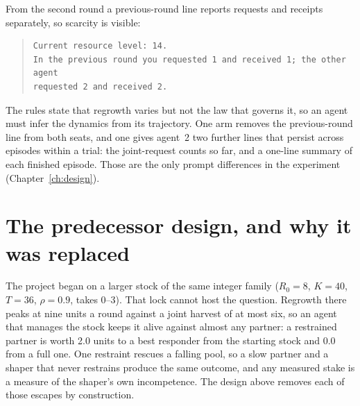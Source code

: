 From the second round a previous-round line reports requests and receipts
separately, so scarcity is visible:

\begin{quote}\small
\begin{verbatim}
Current resource level: 14.
In the previous round you requested 1 and received 1; the other agent
requested 2 and received 2.
\end{verbatim}
\end{quote}

The rules state that regrowth varies but not the law that governs it, so an
agent must infer the dynamics from its trajectory.
One arm removes the previous-round line from both seats, and one gives
agent~2 two further lines that persist across episodes within a trial: the
joint-request counts so far, and a one-line summary of each finished
episode.
Those are the only prompt differences in the experiment
(Chapter~\ref{ch:design}).

\section{The predecessor design, and why it was replaced}
\label{sec:env-pond}

The project began on a larger stock of the same integer family
(\(R_0=8\), \(K=40\), \(T=36\), \(\rho=0.9\), takes 0--3).
That lock cannot host the question.
Regrowth there peaks at nine units a round against a joint harvest of at
most six, so an agent that manages the stock keeps it alive against almost
any partner: a restrained partner is worth 2.0 units to a best responder
from the starting stock and 0.0 from a full one.
One restraint rescues a falling pool, so a slow partner and a shaper that
never restrains produce the same outcome, and any measured stake is a
measure of the shaper's own incompetence.
The design above removes each of those escapes by construction.
